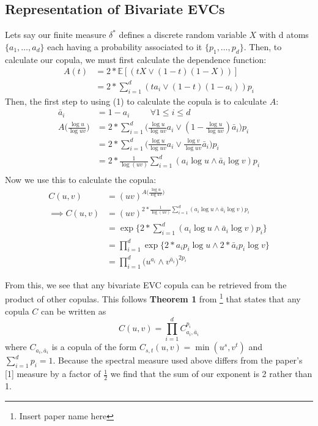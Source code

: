 \documentclass[12pt]{article}
\def\E{\mathbb{E}}
\theoremstyle{definition}
\theoremstyle{definition}
\begin{document}
\subsection{Representation of Bivariate EVCs}
Lets say our finite measure $\delta^*$ defines a discrete random variable $X$ with d atoms $\{a_1, \hdots, a_d\}$ each having a probability associated to it $\{p_1, \hdots, p_d\}$. Then, to calculate our copula, we must first calculate the dependence function:
\begin{align*}
    A(t)&=2* \E[(tX\vee (1-t)(1-X))]\\
    &=2*\sum_{i=1}^d(ta_i\vee (1-t)(1-a_i))p_i
\end{align*}
Then, the first step to using (1) to calculate the copula is to calculate $A$:
\begin{align*}
\bar{a}_i&=1-a_i \hspace{1cm} \forall 1\leq i\leq d\\
    A\big( \frac{\log u}{\log uv} \big)&=2*\sum_{i=1}^d\bigg(\frac{\log u}{\log uv}a_i\vee(1-\frac{\log u}{\log uv})\bar{a}_i\bigg)p_i\\
    &=2*\sum_{i=1}^d\bigg(\frac{\log u}{\log uv}a_i\vee\frac{\log v}{\log uv}\bar{a}_i\bigg)p_i\\
    &=2*\frac{1}{\log(uv)}\sum_{i=1}^d(a_i\log u \wedge \bar{a}_i\log v)p_i\\
\end{align*}
Now we use this to calculate the copula:
\begin{align*}
    C(u,v)&=(uv)^{A\big( \frac{\log u}{\log uv} \big)}\\
    \implies C(u,v)&=(uv)^{2*\frac{1}{\log(uv)}\sum_{i=1}^d(a_i\log u \wedge \bar{a}_i\log v)p_i}\\
    &=\exp\{2*\sum_{i=1}^d(a_i\log u \wedge \bar{a}_i\log v)p_i\}\\
    &=\prod_{i=1}^d\exp\{2*a_ip_i\log u \wedge 2*\bar{a}_ip_i\log v\}\\
    &=\prod_{i=1}^d\bigg(u^{a_i}\wedge v^{\bar{a}_i}\bigg)^{2p_i}
\end{align*}

From this, we see that any bivariate EVC copula can be retrieved from the product of other copulas. This follows \textbf{Theorem 1} from \footnote{Insert paper name here} that states that any copula $C$ can be written as 
$$C(u,v)= \prod_{i=1}^dC_{a_i,\bar{a}_i}^{p_i}$$
where $C_{a_i,\bar{a}_i}$ is a copula of the form $C_{s,t}(u,v)=\min(u^s,v^t)$ and $\sum_{i=1}^dp_i=1$. Because the spectral measure used above differs from the paper's [1] measure by a factor of $\frac{1}{2}$ we find that the sum of our exponent is 2 rather than 1.
\end{document}
